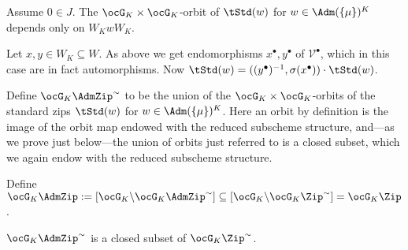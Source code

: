 \documentclass[a4paper]{scrartcl} %
\numberwithin{equation}{section}
\begin{document}
\begin{Lemma} \label{orbits-kr} Assume $0\in J$.
  The $\ocG_K\times\ocG_K$-orbit of $\tStd(w)$ for $w\in\Adm(\{\mu\})^K$ depends only on $W_KwW_K$.
\end{Lemma}

\begin{Proof}
  Let $x,y\in W_K \subseteq W$. As above we get endomorphisms $x^\bullet,y^\bullet$ of $\mathcal{V}^\bullet$, which in this case are in fact automorphisms. Now $\tStd(w)=((y^\bullet)^{-1},\sigma(x^\bullet))\cdot\tStd(w)$.
\end{Proof}




\begin{Definition}
  Define $\ocG_K\AdmZip^{\sim}$ to be the union of the $\ocG_K\times\ocG_K$-orbits of the standard zips $\tStd(w)$ for $w\in\Adm(\{\mu\})^K$. Here an orbit by definition is the image of the orbit map endowed with the reduced subscheme structure, and---as we prove just below---the union of orbits just referred to is a closed subset, which we again endow with the reduced subscheme structure.

  Define $\ocG_K\AdmZip:=[\ocG_K\backslash\ocG_K\AdmZip^{\sim}]\subseteq [\ocG_K\backslash\ocG_K\Zip^{\sim}]=\ocG_K\Zip$.
\end{Definition}




\begin{Lemma}\label{admzip-closed}
  $\ocG_K\AdmZip^{\sim}$ is a closed subset of $\ocG_K\Zip^{\sim}$.
\end{Lemma}
\end{document}
